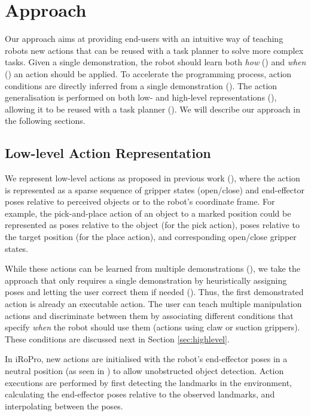 \section{Approach}
\label{sec:approach}
Our approach aims at providing end-users with an intuitive way of teaching robots new actions that can be reused with a task planner to solve more complex tasks.
Given a single demonstration, the robot should learn both \textit{how} () and \textit{when} () an action should be applied.
To accelerate the programming process, action conditions are directly inferred from a single demonstration ().
The action generalisation is performed on both low- and high-level representations (), allowing it to be reused with a task planner ().
We will describe our approach in the following sections.

\subsection{Low-level Action Representation}
\label{sec:lowlevel}
We represent low-level actions as proposed in previous work (\cite{akgun2012keyframe,alexandrova2014robot}), where the action is represented as a sparse sequence of gripper states (open/close) and end-effector poses relative to perceived objects or to the robot's coordinate frame.
For example, the pick-and-place action of an object to a marked position could be represented as poses relative to the object (for the pick action), poses relative to the target position (for the place action), and corresponding open/close gripper states. 

While these actions can be learned from multiple demonstrations (\cite{niekum2012learning}), we take the approach that only requires a single demonstration by heuristically assigning poses and letting the user correct them if needed (\cite{alexandrova2014robot}).
Thus, the first demonstrated action is already an executable action.
The user can teach multiple manipulation actions and discriminate between them by associating different conditions that specify \textit{when} the robot should use them (\eg actions using claw or suction grippers).
These conditions are discussed next in Section \ref{sec:highlevel}.

In iRoPro, new actions are initialised with the robot's end-effector poses in a neutral position (as seen in ) to allow unobstructed object detection.
Action executions are performed by first detecting the landmarks in the environment, calculating the end-effector poses relative to the observed landmarks, and interpolating between the poses.

